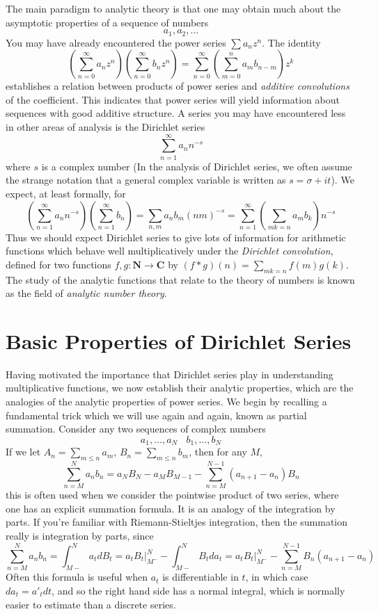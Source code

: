 The main paradigm to analytic theory is that one may obtain much about the asymptotic properties of a sequence of numbers
%
\[ a_1, a_2, \dots \]
%
You may have already encountered the power series $\sum a_n z^n$. The identity
%
\[ \left( \sum_{n = 0}^\infty a_n z^n \right) \left( \sum_{n = 0}^\infty b_n z^n \right) = \sum_{n = 0}^\infty \left( \sum_{m = 0}^n a_m b_{n-m} \right) z^k \]
%
establishes a relation between products of power series and {\it additive convolutions} of the coefficient. This indicates that power series will yield information about sequences with good additive structure. A series you may have encountered less in other areas of analysis is the Dirichlet series
%
\[ \sum_{n = 1}^\infty a_n n^{-s} \]
%
where $s$ is a complex number (In the analysis of Dirichlet series, we often assume the strange notation that a general complex variable is written as $s = \sigma + it$). We expect, at least formally, for
%
\[ \left( \sum_{n = 1}^\infty a_n n^{-s} \right) \left( \sum_{n = 1}^\infty b_n  \right) = \sum_{n,m} a_n b_m (nm)^{-s} = \sum_{n = 1}^\infty \left( \sum_{mk = n} a_m b_k \right) n^{-s} \]
%
Thus we should expect Dirichlet series to give lots of information for arithmetic functions which behave well multiplicatively under the {\it Dirichlet convolution}, defined for two functions $f,g: \mathbf{N} \to \mathbf{C}$ by $(f * g)(n) = \sum_{mk = n} f(m) g(k)$. The study of the analytic functions that relate to the theory of numbers is known as the field of {\it analytic number theory}.

\chapter{Basic Properties of Dirichlet Series}

Having motivated the importance that Dirichlet series play in understanding multiplicative functions, we now establish their analytic properties, which are the analogies of the analytic properties of power series. We begin by recalling a fundamental trick which we will use again and again, known as partial summation. Consider any two sequences of complex numbers
%
\[ a_1, \dots, a_N\ \ \ \ b_1, \dots, b_N \]
%
If we let $A_n = \sum_{m \leq n} a_m$, $B_n = \sum_{m \leq n} b_m$, then for any $M$,
%
\[ \sum_{n = M}^N a_nb_n = a_N B_N - a_M B_{M-1} - \sum_{n = M}^{N-1} (a_{n+1} - a_n) B_n \]
%
this is often used when we consider the pointwise product of two series, where one has an explicit summation formula. It is an analogy of the integration by parts. If you're familiar with Riemann-Stieltjes integration, then the summation really is integration by parts, since
%
\[ \sum_{n = M}^N a_nb_n = \int_{M-}^N a_t dB_t = \left. a_tB_t \right|_{M^-}^N - \int_{M-}^N B_t da_t = \left. a_tB_t \right|_{M^-}^N - \sum_{n = M}^{N-1} B_n (a_{n+1} - a_n) \]
%
Often this formula is useful when $a_t$ is differentiable in $t$, in which case $da_t = a'_t dt$, and so the right hand side has a normal integral, which is normally easier to estimate than a discrete series.

